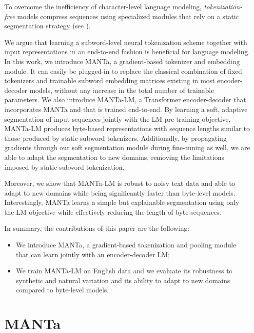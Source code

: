 To overcome the inefficiency of character-level language modeling, \textit{tokenization-free} models \citep{clark2022canine,tay2021charformer} compress sequences using specialized modules that rely on a static segmentation strategy (see ).

We argue that learning a subword-level neural tokenization scheme together with input representations in an end-to-end fashion is beneficial for language modeling. In this work, we introduce MANTa, a gradient-based tokenizer and embedding module. It can easily be plugged-in to replace the classical combination of fixed tokenizers and trainable subword embedding matrices existing in most encoder-decoder models, without any increase in the total number of trainable parameters. We also introduce MANTa-LM, a Transformer encoder-decoder that incorporates MANTa and that is trained end-to-end. By learning a soft, adaptive segmentation of input sequences jointly with the LM pre-training objective, MANTa-LM produces byte-based representations with sequence lengths similar to those produced by static subword tokenizers. Additionally, by propagating gradients through our soft segmentation module during fine-tuning as well, we are able to adapt the segmentation to new domains, removing the limitations imposed by static subword tokenization.


    

Moreover, we show that MANTa-LM is robust to noisy text data and able to adapt to new domains while being significantly faster than byte-level models. Interestingly, MANTa learns a simple but explainable segmentation using only the LM objective while effectively reducing the length of byte sequences.

In summary, the contributions of this paper are the following: 
\begin{itemize}
    \item We introduce MANTa, a gradient-based tokenization and pooling module that can learn jointly with an encoder-decoder LM;
    \item We train MANTa-LM on English data and we evaluate its robustness to synthetic and natural variation and its ability to adapt to new domains compared to byte-level models.
\end{itemize}


\section{MANTa}

